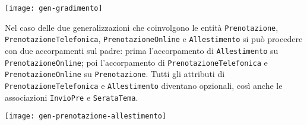 \vspace{5pt}\centerline{\texttt{[image: gen-gradimento]}}

\vspace{15pt}

Nel caso delle due generalizzazioni che coinvolgono le entità {\tt Prenotazione},
{\tt PrenotazioneTelefonica}, {\tt PrenotazioneOnline} e {\tt Allestimento} si può
procedere con due accorpamenti sul padre: prima l'accorpamento di {\tt Allestimento}
su {\tt PrenotazioneOnline}; poi l'accorpamento di {\tt PrenotazioneTelefonica} e
{\tt PrenotazioneOnline} su {\tt Prenotazione}. Tutti gli attributi di {\tt PrenotazioneTelefonica}
e {\tt Allestimento} diventano opzionali, così anche le associazioni {\tt InvioPre}
e {\tt SerataTema}. %

\vspace{5pt}\centerline{\texttt{[image: gen-prenotazione-allestimento]}}
